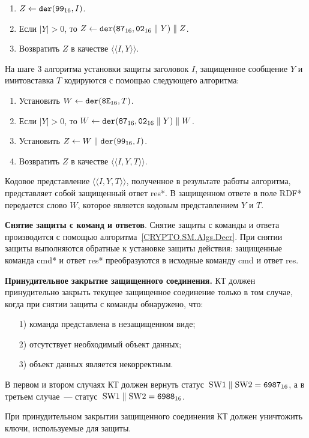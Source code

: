 \begin{enumerate}
\item
$Z\gets \texttt{der}(\texttt{99}_{16}, I)$.
\item
Если $|Y| > 0$,  то $Z\gets \texttt{der}(\texttt{87}_{16}, \texttt{02}_{16} \parallel Y) \parallel Z$. 
\item
Возвратить $Z$ в качестве $\langle\langle I, Y \rangle\rangle$.
\end{enumerate}

На шаге 3 алгоритма установки защиты заголовок $I$, защищенное сообщение $Y$ и 
имитовставка $T$ кодируются с помощью следующего алгоритма: 

\begin{enumerate}
\item 
Установить $W\gets\texttt{der}(\texttt{8E}_{16}, T)$.
\item 
Если $|Y| > 0$, 
то $W \gets \texttt{der}(\texttt{87}_{16}, \texttt{02}_{16}\parallel Y) \parallel W$.
\item
Установить $Z \gets W \parallel \texttt{der}(\texttt{99}_{16}, I)$.
\item
Возвратить $Z$ в качестве $\langle \langle I, Y, T\rangle\rangle$.
\end{enumerate}

Кодовое представление  $\langle\langle I, Y, T \rangle\rangle$, 
полученное в результате работы алгоритма, 
представляет собой защищенный ответ res*. 
В защищенном ответе в поле RDF* передается слово $W$, 
которое является кодовым представлением $Y$ и $T$. 

{\bf Снятие защиты с команд и ответов}. 
%
Снятие защиты с команды и ответа производится с помощью 
алгоритма~\ref{CRYPTO.SM.Algs.Decr}.  
При снятии защиты выполняются обратные к установке защиты действия: 
защищенные команда cmd* и ответ res* преобразуются в исходные команду cmd  
и ответ res.  

{\bf Принудительное закрытие защищенного соединения.}
%
КТ должен принудительно закрыть текущее защищенное соединение только в том случае, 
когда при снятии защиты с команды обнаружено, что: 
\begin{enumerate}
\item[1)] команда представлена в незащищенном виде;
\item[2)] отсутствует необходимый объект данных;
\item[3)] объект данных является некорректным.
\end{enumerate}

В первом и втором случаях КТ должен вернуть 
статус~$\text{SW1} \parallel \text{SW2} = \texttt{6987}_{16}$, 
а в третьем случае~--- статус~$\text{SW1} \parallel \text{SW2} = 
\texttt{6988}_{16}$.  

При принудительном закрытии защищенного соединения КТ должен уничтожить 
ключи, используемые для защиты. 
